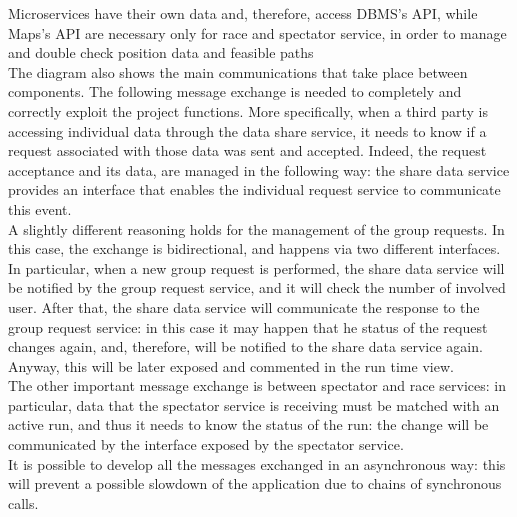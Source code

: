 Microservices have their own data and, therefore, access DBMS's API, while Maps's API are necessary 
only for race and spectator service, in order to manage and double check position data and feasible paths
\\
The diagram also shows the main communications that take place between components. The following message exchange is needed to completely and
correctly exploit the project functions. 
More specifically, when a third party is accessing individual data through the data share service, it
needs to know if a request associated with those data was sent and accepted. 
Indeed, the request acceptance and its data, are managed in the following way: the share data service provides an  interface that enables the
individual request service to communicate this event. \\ 
A slightly different reasoning holds for the management of the group requests. In this case, the exchange is bidirectional, and happens via
two different interfaces. 
In particular, when a new group request is performed, the share data service will be notified by the group request service, and it will check
the number of involved user.
After that, the share data service will communicate the response to the group request service: in this case it may happen that he status of
the request changes again, and, therefore, will be notified to the share data service again. Anyway, this will be later exposed and commented
in the run time view.  \\
The other important message exchange is between spectator and race services: in particular, data that the spectator service is receiving must
be matched with an active run, and thus it needs to know the status of the run: the change will be communicated by the interface exposed
by the spectator service. \\
It is possible to develop all the messages exchanged in an asynchronous way: this will prevent a possible slowdown of the application 
due to chains of synchronous calls.